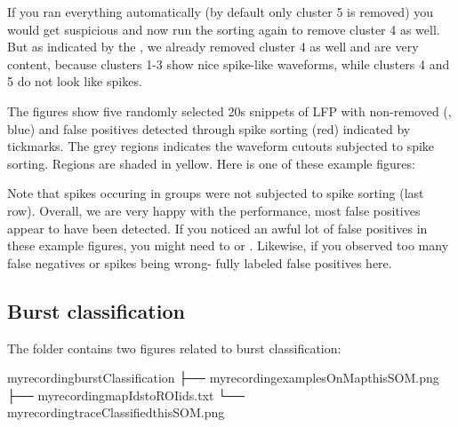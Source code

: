 \documentclass[letterpaper,10pt,english]{sphinxmanual}
\let\sphinxpxdimen\pdfpxdimen\else\newdimen\sphinxpxdimen
\begin{document}
If you ran everything automatically (by default only cluster 5 is removed) you would get suspicious and now run the
sorting again to remove cluster 4 as well.
But as indicated by the , we already removed cluster 4 as well and are very content, because clusters
1-3 show nice spike-like waveforms, while clusters 4 and 5 do not look like spikes.

The figures  show five randomly selected 20s snippets of LFP with non-removed (, blue)
and false positives detected through spike sorting (red) indicated by tickmarks. The grey regions indicates the waveform
cutouts subjected to spike sorting.
Regions {\hyperref[\detokenize{preprocessing:artifacts}]{}} are shaded in yellow.
Here is one of these example figures:

\noindent{\hspace*{\fill}\sphinxincludegraphics[width=700\sphinxpxdimen]{{my_recording__fpRemoval_ex3}.png}\hspace*{\fill}}

Note that spikes occuring in groups were not subjected to spike sorting (last row). Overall, we are very happy
with the performance, most false positives appear to have been detected. If you noticed an awful lot of false positives
in these example figures, you might need to {\hyperref[\detokenize{LFP_to_bursts:spikes-spectral}]{}}
or {\hyperref[\detokenize{LFP_to_bursts:spikesorting}]{}}. Likewise, if you observed too many false negatives or spikes being wrong-
fully labeled false positives here.


\subsection{Burst classification}
\label{\detokenize{output:burst-classification}}
The folder  contains two figures related to burst classification:

%
\begin{sphinxVerbatim}[commandchars=\\\{\}]
my\PYGZus{}recording\PYGZus{}\PYGZus{}burstClassification
   ├── my\PYGZus{}recording\PYGZus{}\PYGZus{}examplesOnMap\PYGZus{}thisSOM.png
   ├── my\PYGZus{}recording\PYGZus{}\PYGZus{}mapIds\PYGZus{}to\PYGZus{}ROIids.txt
   └── my\PYGZus{}recording\PYGZus{}\PYGZus{}traceClassified\PYGZus{}thisSOM.png
\end{sphinxVerbatim}
\end{document}
